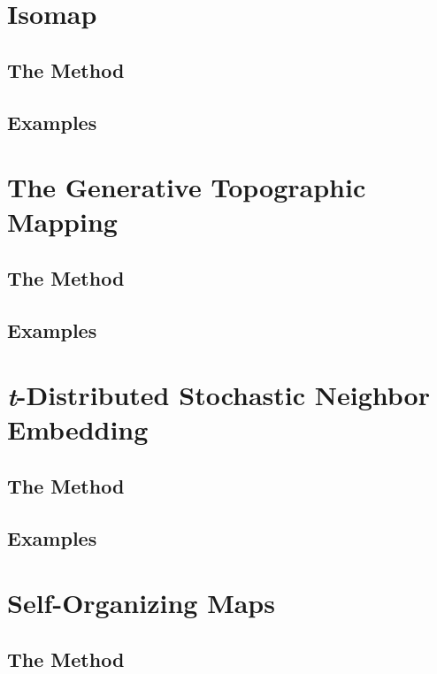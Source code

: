 \documentclass[11pt, oneside]{book}
\begin{document}
\section{Isomap}

\subsection{The Method}


\subsection{Examples}


\section{The Generative Topographic Mapping}

\subsection{The Method}


\subsection{Examples}


\section{\textit{t}-Distributed Stochastic Neighbor Embedding}

\subsection{The Method}


\subsection{Examples}


\section{Self-Organizing Maps}

\subsection{The Method}
\end{document}
